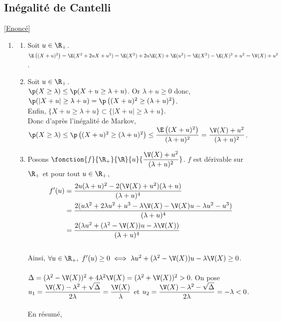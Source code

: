 \documentclass[8pt]{book}
\begin{document}
	\subsection{Inégalité de Cantelli }
	\label{Inégalité de Cantelli corrigé}
		\textcolor{blue}{\hyperref[Inégalité de Cantelli]{[Enoncé]}}\\
	\begin{enumerate}
		\item \begin{enumerate}
			\item Soit $u\in \R_+$.\\
			$\E\left((X+u)^2\right)=\E(X^2+2uX+u^2)=\E(X^2)+2u\E(X)+\E(u^2)=\E(X^2)-\E(X)^2+u^2=\V(X)+u^2$.
			\item Soit $u\in \R_+$.\\
			$\p(X\geq \lambda)\leq \p(X+u\geq \lambda+u)$. Or $\lambda+u\geq 0$ donc, $\p(|X+u|\geq \lambda+u)=\p\left((X+u)^2\geq (\lambda+u)^2\right)$.\\
			Enfin, $\{X+u\geq \lambda+u\}\subset \{|X+u|\geq \lambda+u\}$.\\
			Donc d'après l'inégalité de Markov, $\p(X\geq \lambda)\leq \p\left((X+u)^2\geq (\lambda+u)^2\right)\leq \displaystyle\frac{\E\left((X+u)^2\right)}{(\lambda+u)^2}=\frac{\V(X)+u^2}{(\lambda+u)^2}$.
			\item Posons $\fonction{f}{\R_+}{\R}{u}{\displaystyle\frac{\V(X)+u^2}{(\lambda+u)^2}}$. $f$ est dérivable sur $\R_+$ et pour tout $u\in \R_+$,
			\begin{align*}
				f'(u)&=\displaystyle\frac{2u(\lambda+u)^2-2(\V(X)+u^2)(\lambda+u)}{(\lambda+u)^4}\\
				&=\frac{2(u\lambda^2+2\lambda u^2+u^3-\lambda\V(X)-\V(X)u-\lambda u^2-u^3)}{(\lambda+u)^4}\\
				&=\frac{2(\lambda u^2+(\lambda^2-\V(X))u-\lambda\V(X))}{(\lambda+u)^4}
			\end{align*}
			\\
			Ainsi, $\forall u\in \R_+,\ f'(u)\geq 0\iff \lambda u^2+(\lambda^2-\V(X))u-\lambda\V(X)\geq 0$.\\\\
			$\Delta=(\lambda^2-\V(X))^2+4\lambda^2\V(X)=(\lambda^2+\V(X))^2>0$. On pose $u_1=\displaystyle\frac{\V(X)-\lambda^2+\displaystyle\sqrt{\Delta}}{2\lambda}=\frac{\V(X)}{\lambda}$ et $u_2=\displaystyle\frac{\V(X)-\lambda^2-\displaystyle\sqrt{\Delta}}{2\lambda}=-\lambda<0$.\\\\
			En résumé,\\\\

\end{enumerate}
\end{enumerate}
\end{document}
